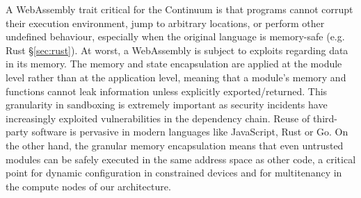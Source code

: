 
A WebAssembly trait critical for the Continuum is that programs cannot corrupt their execution environment, jump to arbitrary locations, or perform other undefined behaviour, especially when the original language is memory-safe (e.g. Rust §\ref{sec:rust}). At worst, a WebAssembly is subject to exploits regarding data in its memory. The memory and state encapsulation are applied at the module level rather than at the application level, meaning that a module's memory and functions cannot leak information unless explicitly exported/returned. This granularity in sandboxing is extremely important as security incidents have increasingly exploited vulnerabilities in the dependency chain. Reuse of third-party software is pervasive in modern languages like JavaScript, Rust or Go. On the other hand, the granular memory encapsulation means that even untrusted modules can be safely executed in the same address space as other code, a critical point for dynamic configuration in constrained devices and for multitenancy in the compute nodes of our architecture.



